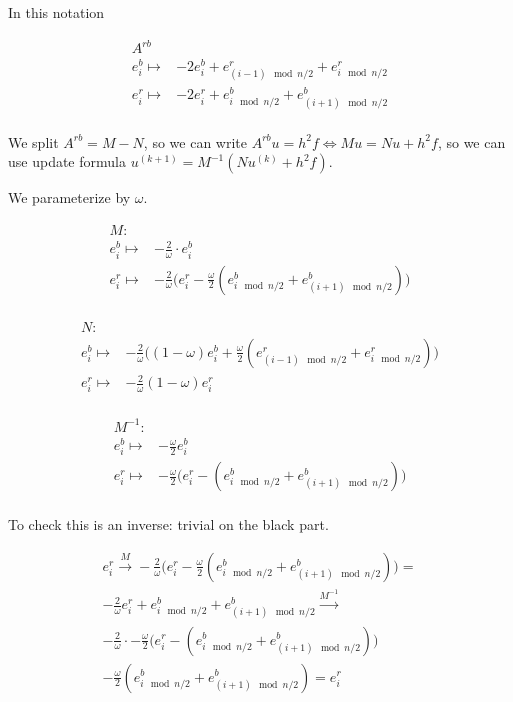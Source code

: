 \documentclass{article}
\begin{document}
\newpage

In this notation

\begin{align*}
    A^{rb} & \\
    e^b_{i} \mapsto & -2e^b_{i} + e^r_{(i - 1) \mod n / 2} + e^r_{i \mod n / 2} \\
    e^r_{i} \mapsto & -2e^r_{i} + e^b_{i \mod n / 2} + e^b_{(i + 1) \mod n / 2} \\ 
\end{align*}

We split $A^{rb} = M - N$, so we can write $A^{rb}u = h^2f \iff Mu = Nu + h^2f$,
so we can use update formula $u^{(k + 1)} = M^{-1}(Nu^{(k)} + h^2f)$.


We parameterize by $\omega$.

\begin{align*}
    M : & \\
    e^b_{i} \mapsto & -\frac{2}{\omega}\cdot e^b_{i} \\
    e^r_{i} \mapsto & -\frac{2}{\omega}\big(e^r_{i} - \frac{\omega}{2} (e^b_{i \mod n / 2} + e^b_{(i + 1) \mod n / 2}) \big) \\
\end{align*}

\begin{align*}
    N : & \\
    e^b_{i} \mapsto & -\frac{2}{\omega}\big((1 - \omega)e^b_{i} + \frac{\omega}{2} (e^r_{(i - 1) \mod n / 2} + e^r_{i \mod n / 2}) \big) \\
    e^r_{i} \mapsto & -\frac{2}{\omega}(1 - \omega)e^r_{i} \\
\end{align*}

\begin{align*}
    M^{-1} : & \\
    e^b_{i} \mapsto & -\frac{\omega}{2} e^b_{i} \\
    e^r_{i} \mapsto & -\frac{\omega}{2}\big(e^r_{i} - (e^b_{i \mod n / 2} + e^b_{(i + 1) \mod n / 2}) \big) \\
\end{align*}


To check this is an inverse: trivial on the black part.

\begin{align*}
    e^r_i \xrightarrow{M} -\frac{2}{\omega}\big(e^r_{i} - \frac{\omega}{2} (e^b_{i \mod n / 2} + e^b_{(i + 1) \mod n / 2}) \big) = \\
    -\frac{2}{\omega}e^r_i + e^b_{i \mod n / 2} + e^b_{(i + 1) \mod n / 2} \xrightarrow{M^{-1}}  \\
    -\frac{2}{\omega} \cdot -\frac{\omega}{2}\big(e^r_{i} - (e^b_{i \mod n / 2} + e^b_{(i + 1) \mod n / 2}) \big) \\
    - \frac{\omega}{2}\left(e^b_{i \mod n / 2} + e^b_{(i + 1) \mod n / 2}\right) = e^r_i
\end{align*}
\end{document}
